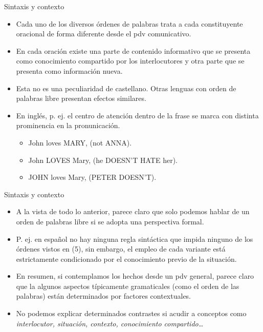 \documentclass{beamer}
\begin{document}
\begin{frame}{Sintaxis y contexto}

	\begin{itemize}
		\item Cada uno de los diversos órdenes de palabras trata a cada constituyente oracional de forma diferente desde el pdv comunicativo.
		\item En cada oración existe una parte de contenido informativo que se presenta como conocimiento compartido por los interlocutores y otra parte que se presenta como información nueva.
		\item Esta no es una peculiaridad de castellano. Otras lenguas con orden de palabras libre presentan efectos similares.
		\item En inglés, p. ej. el centro de atención dentro de la frase se marca con distinta prominencia en la pronunicación.
		\begin{itemize}
			\item John loves MARY, (not ANNA).
			\item John LOVES Mary, (he DOESN'T HATE her).
			\item JOHN loves Mary, (PETER DOESN'T).
		\end{itemize}
	\end{itemize}

\end{frame}

\begin{frame}{Sintaxis y contexto}

	\begin{itemize}
		\item A la vista de todo lo anterior, parece claro que solo podemos hablar de un orden de palabras libre si se adopta una perspectiva formal. 
		\item P. ej. en español no hay ninguna regla sintáctica que impida ninguno de los órdenes vistos en (5), sin embargo, el empleo de cada variante está estrictamente condicionado por el conocimiento previo de la situación.
		\item En resumen, si contemplamos los hechos desde un pdv general, parece claro que la algunos aspectos típicamente gramaticales (como el orden de las palabras) están determinados por factores contextuales.
		\item No podemos explicar determinados contrastes si acudir a conceptos como \it{interlocutor, situación, contexto, conocimiento compartido\ldots}
	\end{itemize}

\end{frame}
\end{document}
